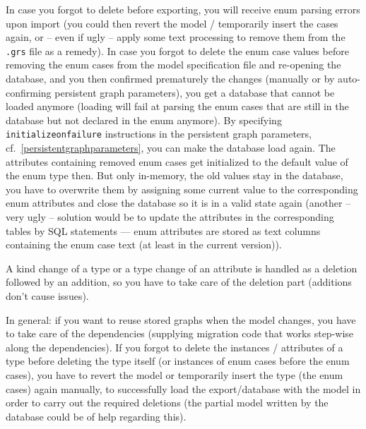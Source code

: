 In case you forgot to delete before exporting, you will receive enum parsing errors upon import (you could then revert the model / temporarily insert the cases again, or -- even if ugly -- apply some text processing to remove them from the \texttt{.grs} file as a remedy).
In case you forgot to delete the enum case values before removing the enum cases from the model specification file and re-opening the database, and you then confirmed prematurely the changes (manually or by auto-confirming persistent graph parameters), you get a database that cannot be loaded anymore (loading will fail at parsing the enum cases that are still in the database but not declared in the enum anymore).
By specifying \texttt{initializeonfailure} instructions in the persistent graph parameters, cf.~\ref{persistentgraphparameters}, you can make the database load again.
The attributes containing removed enum cases get initialized to the default value of the enum type then.
But only in-memory, the old values stay in the database, you have to overwrite them by assigning some current value to the corresponding enum attributes and close the database so it is in a valid state again
(another -- very ugly -- solution would be to update the attributes in the corresponding tables by SQL statements --- enum attributes are stored as text columns containing the enum case text (at least in the current version)).

A kind change of a type or a type change of an attribute is handled as a deletion followed by an addition, so you have to take care of the deletion part (additions don't cause issues).

In general: if you want to reuse stored graphs when the model changes, you have to take care of the dependencies (supplying migration code that works step-wise along the dependencies).
If you forgot to delete the instances / attributes of a type before deleting the type itself (or instances of enum cases before the enum cases), you have to revert the model or temporarily insert the type (the enum cases) again manually, to successfully load the export/database with the model in order to carry out the required deletions (the partial model written by the database could be of help regarding this).
